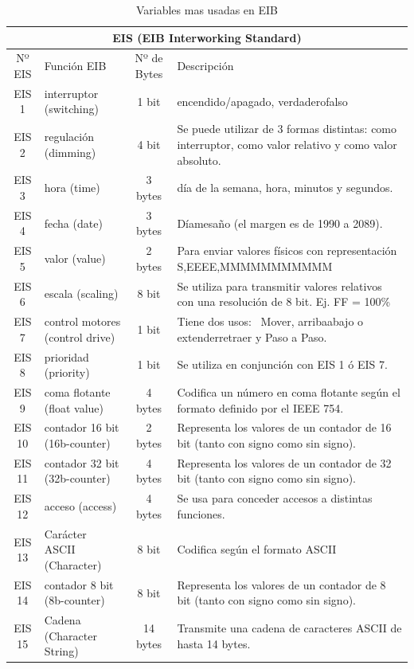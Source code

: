 \begin{table}[htbp]
\centering \scriptsize
\begin{tabular}{cp{4cm}cp{5.5cm}}
\multicolumn{4}{c}{EIS (EIB Interworking Standard)} \\ \toprule
Nº EIS& Función EIB              & Nº de Bytes &  Descripción \\ \midrule
EIS 1 & interruptor (switching)  & 1 bit & encendido/apagado, verdadero\/falso \\ \midrule
EIS 2 & regulación (dimming)     & 4 bit & Se puede utilizar de 3 formas distintas:  como interruptor, como valor relativo  y como valor absoluto. \\ \midrule
EIS 3 & hora (time)              & 3 bytes    & día de la semana, hora, minutos y segundos. \\ \midrule
EIS 4 & fecha (date)             & 3 bytes   & Día\/mes\/año (el margen es de 1990 a 2089). \\ \midrule
EIS 5 & valor (value)            & 2 bytes  & Para enviar valores físicos con representación  S,EEEE,MMMMMMMMMMM \\ \midrule
EIS 6 & escala (scaling) & 8 bit & Se utiliza para transmitir valores relativos  con una resolución de 8 bit. Ej. FF = 100\% \\ \midrule
EIS 7 & control motores (control drive) & 1 bit & Tiene dos usos: \ Mover, arriba\/abajo o extender\/retraer y Paso a Paso. \\ \midrule
EIS 8 & prioridad (priority) & 1 bit & Se utiliza en conjunción con EIS 1 ó EIS 7. \\ \midrule
EIS 9 & coma flotante (float value) & 4 bytes & Codifica un número en coma flotante  según el formato definido por el IEEE 754. \\ \midrule
EIS 10 & contador 16 bit (16b-counter) & 2 bytes & Representa los valores de un contador de 16 bit  (tanto con signo como sin signo). \\ \midrule
EIS 11 & contador 32 bit (32b-counter) & 4 bytes & Representa los valores de un contador de 32 bit  (tanto con signo como sin signo). \\ \midrule
EIS 12 & acceso (access) & 4 bytes & Se usa para conceder accesos a distintas funciones. \\ \midrule
EIS 13 & Carácter ASCII (Character) & 8 bit & Codifica según el formato ASCII \\ \midrule
EIS 14 & contador 8 bit (8b-counter) & 8 bit & Representa los valores de un contador de 8 bit  (tanto con signo como sin signo). \\ \midrule
EIS 15 & Cadena (Character String) & 14 bytes & Transmite una cadena de caracteres ASCII  de hasta 14 bytes. \\ \bottomrule
\end{tabular}
\caption{Variables mas usadas en EIB}
\label{tab:variables_eib}
\end{table}



